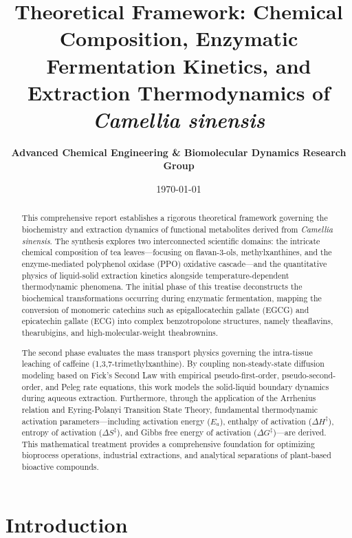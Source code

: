 \documentclass{article}
\title{\textbf{Theoretical Framework: Chemical Composition, Enzymatic Fermentation Kinetics, and Extraction Thermodynamics of \textit{Camellia sinensis}}}
\author{\textbf{Advanced Chemical Engineering \& Biomolecular Dynamics Research Group}}
\date{\today}
\begin{document}
\maketitle

\begin{abstract}
This comprehensive report establishes a rigorous theoretical framework governing the biochemistry and extraction dynamics of functional metabolites derived from \textit{Camellia sinensis}. The synthesis explores two interconnected scientific domains: the intricate chemical composition of tea leaves—focusing on flavan-3-ols, methylxanthines, and the enzyme-mediated polyphenol oxidase (PPO) oxidative cascade—and the quantitative physics of liquid-solid extraction kinetics alongside temperature-dependent thermodynamic phenomena. The initial phase of this treatise deconstructs the biochemical transformations occurring during enzymatic fermentation, mapping the conversion of monomeric catechins such as epigallocatechin gallate (EGCG) and epicatechin gallate (ECG) into complex benzotropolone structures, namely theaflavins, thearubigins, and high-molecular-weight theabrownins.

The second phase evaluates the mass transport physics governing the intra-tissue leaching of caffeine (1,3,7-trimethylxanthine). By coupling non-steady-state diffusion modeling based on Fick's Second Law with empirical pseudo-first-order, pseudo-second-order, and Peleg rate equations, this work models the solid-liquid boundary dynamics during aqueous extraction. Furthermore, through the application of the Arrhenius relation and Eyring-Polanyi Transition State Theory, fundamental thermodynamic activation parameters—including activation energy ($E_a$), enthalpy of activation ($\Delta H^\ddagger$), entropy of activation ($\Delta S^\ddagger$), and Gibbs free energy of activation ($\Delta G^\ddagger$)—are derived. This mathematical treatment provides a comprehensive foundation for optimizing bioprocess operations, industrial extractions, and analytical separations of plant-based bioactive compounds.
\end{abstract}

\section{Introduction}
\end{document}
